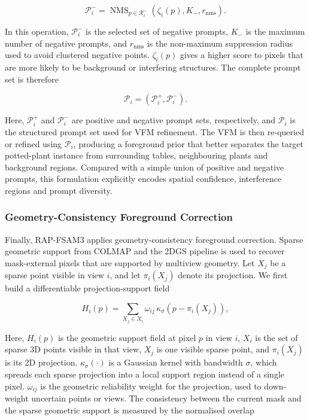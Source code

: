 \documentclass[a4paper]{cas-sc}
\begin{document}
\[
\mathcal{P}_i^{-}=\operatorname{NMS}_{p\in\mathcal{R}_i^{-}}
\left(\zeta_i(p),K_{-},r_{\text{nms}}\right).
\]

In this operation, \(\mathcal{P}_i^-\) is the selected set of negative prompts, \(K_-\) is the maximum number of negative prompts, and \(r_{\text{nms}}\) is the non-maximum suppression radius used to avoid clustered negative points. \(\zeta_i(p)\) gives a higher score to pixels that are more likely to be background or interfering structures. The complete prompt set is therefore

\[
\mathcal{P}_i=\left(\mathcal{P}_i^{+},\mathcal{P}_i^{-}\right).
\]

Here, \(\mathcal{P}_i^+\) and \(\mathcal{P}_i^-\) are positive and negative prompt sets, respectively, and \(\mathcal{P}_i\) is the structured prompt set used for VFM refinement. The VFM is then re-queried or refined using \(\mathcal{P}_i\), producing a foreground prior that better separates the target potted-plant instance from surrounding tables, neighbouring plants and background regions. Compared with a simple union of positive and negative prompts, this formulation explicitly encodes spatial confidence, interference regions and prompt diversity.

\subsubsection{Geometry-Consistency Foreground Correction}\label{sec:geometry-consistency-correction}

Finally, RAP-FSAM3 applies geometry-consistency foreground correction. Sparse geometric support from COLMAP and the 2DGS pipeline is used to recover mask-external pixels that are supported by multiview geometry. Let \(X_j\) be a sparse point visible in view \(i\), and let \(\pi_i(X_j)\) denote its projection. We first build a differentiable projection-support field

\[
H_i(p)=\sum_{X_j\in X_i}\omega_{ij}\,
\kappa_{\sigma}\!\left(p-\pi_i(X_j)\right),
\]

Here, \(H_i(p)\) is the geometric support field at pixel \(p\) in view \(i\), \(X_i\) is the set of sparse 3D points visible in that view, \(X_j\) is one visible sparse point, and \(\pi_i(X_j)\) is its 2D projection. \(\kappa_{\sigma}(\cdot)\) is a Gaussian kernel with bandwidth \(\sigma\), which spreads each sparse projection into a local support region instead of a single pixel. \(\omega_{ij}\) is the geometric reliability weight for the projection, used to down-weight uncertain points or views. The consistency between the current mask and the sparse geometric support is measured by the normalised overlap
\end{document}
